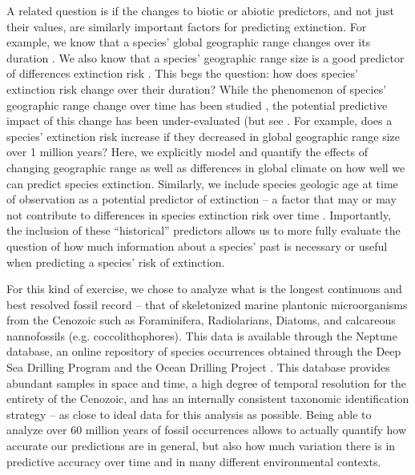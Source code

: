 \documentclass[12pt,letterpaper]{article}
\begin{document}
A related question is if the changes to biotic or abiotic predictors, and not just their values, are similarly important factors for predicting extinction. For example, we know that a species' global geographic range changes over its duration \citep{Foote2007,Liow2010,Liow2007,Kiessling2013}. We also know that a species' geographic range size is a good predictor of differences extinction risk \citep{Payne2007,Jablonski2003,Jablonski2008,Jablonski2006}. This begs the question: how does species' extinction risk change over their duration? While the phenomenon of species' geographic range change over time has been studied \citep{Foote2007,Liow2010,Liow2007,Kiessling2013}, the potential predictive impact of this change has been under-evaluated (but see \citet{Kiessling2013}. For example, does a species' extinction risk increase if they decreased in global geographic range size over 1 million years? Here, we explicitly model and quantify the effects of changing geographic range as well as differences in global climate on how well we can predict species extinction. Similarly, we include species geologic age at time of observation as a potential predictor of extinction -- a factor that may or may not contribute to differences in species extinction risk over time \citep{Smits2015,Finnegan2008,Ezard2012,VanValen1973,Liow2011,Crampton2016}. Importantly, the inclusion of these ``historical'' predictors allows us to more fully evaluate the question of how much information about a species' past is necessary or useful when predicting a species' risk of extinction.

For this kind of exercise, we chose to analyze what is the longest continuous and best resolved fossil record -- that of skeletonized marine plantonic microorganisms from the Cenozoic such as Foraminifera, Radiolarians, Diatoms, and calcareous nannofossils (e.g. coccolithophores). This data is available through the Neptune database, an online repository of species occurrences obtained through the Deep Sea Drilling Program and the Ocean Drilling Project \citep{Lazarus1994,SpencerCervato1999}. This database provides abundant samples in space and time, a high degree of temporal resolution for the entirety of the Cenozoic, and has an internally consistent taxonomic identification strategy -- as close to ideal data for this analysis as possible. Being able to analyze over 60 million years of fossil occurrences allows to actually quantify how accurate our predictions are in general, but also how much variation there is in predictive accuracy over time and in many different environmental contexts.
\end{document}
